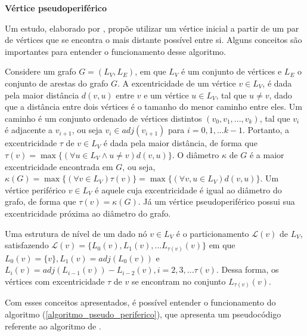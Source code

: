 {\bf Vértice pseudoperiférico}

Um estudo, elaborado por , propõe utilizar um vértice inicial a partir de um par de vértices que se encontra o mais distante possível entre si. Alguns conceitos são importantes para entender o funcionamento desse algoritmo.

Considere um grafo $G = (L_V, L_E)$, em que $L_V$ é um conjunto de vértices e $L_E$ o conjunto de arestas do grafo $G$. A excentricidade de um vértice $v \in L_V$, é dada pela maior distância $d(v,u)$ entre $v$ e um vértice $u \in L_V$, tal que $u \neq v$, dado que a distância entre dois vértices é o tamanho do menor caminho entre eles. Um caminho é um conjunto ordenado de vértices distintos $(v_0,v_1,..., v_k)$, tal que $v_i$ é adjacente a $v_{i+1}$, ou seja $v_i \in adj(v_{i+1})$ para $i=0,1,...k-1$. Portanto, a excentricidade $\tau$ de $v \in L_V$ é dada pela maior distância, de forma que $\tau(v) = \max \{ (\forall u \in L_V \wedge u \neq v) d(v,u) \}$. O diâmetro $\kappa$ de $G$ é a maior excentricidade encontrada em $G$, ou seja, $\kappa(G) = \max \{ (\forall v \in L_V) \tau (v) \} = \max \{ (\forall v,u \in L_V) d(v,u) \}$. Um vértice periférico $v \in L_V$ é aquele cuja excentricidade é igual ao diâmetro do grafo, de forma que $\tau(v) = \kappa(G)$. Já um vértice pseudoperiférico possui sua excentricidade próxima ao diâmetro do grafo.

Uma  estrutura de nível de um dado nó $v \in L_V$ é o particionamento $\mathscr{L}(v)$ de $L_V$, satisfazendo $\mathscr{L}(v) = \{ L_{0}(v), L_{1}(v), ... L_{\tau(v)} (v) \}$ em que $L_{0} (v) = \{ v \}, L_{1} (v) = adj (L_{0} (v) )$ e $L_{i} (v) = adj( L_{i-1} (v) ) - L_{i-2} (v), i = 2, 3, ... \tau(v) $. Dessa forma, os vértices com excentricidade $\tau$ de $v$ se encontram no conjunto $L_{\tau(v)}(v)$. 

Com esses conceitos apresentados, é possível entender o funcionamento do algoritmo (\ref{algoritmo_pseudo_periferico}), que apresenta um pseudocódigo referente ao algoritmo de .

